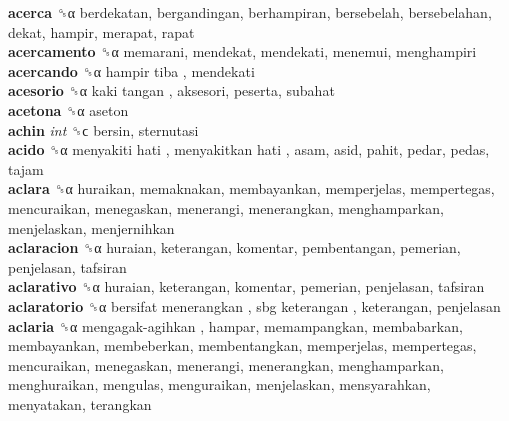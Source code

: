 \textbf{acerca} ␝α  berdekatan, bergandingan, berhampiran, bersebelah, bersebelahan, dekat, hampir, merapat, rapat  \\
\textbf{acercamento} ␝α  memarani, mendekat, mendekati, menemui, menghampiri  \\
\textbf{acercando} ␝α   hampir tiba , mendekati  \\
\textbf{acesorio} ␝α   kaki tangan , aksesori, peserta, subahat  \\
\textbf{acetona} ␝α  aseton  \\
\textbf{achin} \emph{int}  ␝ϲ  bersin, sternutasi  \\
\textbf{acido} ␝α   menyakiti hati ,  menyakitkan hati , asam, asid, pahit, pedar, pedas, tajam  \\
\textbf{aclara} ␝α  huraikan, memaknakan, membayankan, memperjelas, mempertegas, mencuraikan, menegaskan, menerangi, menerangkan, menghamparkan, menjelaskan, menjernihkan  \\
\textbf{aclaracion} ␝α  huraian, keterangan, komentar, pembentangan, pemerian, penjelasan, tafsiran  \\
\textbf{aclarativo} ␝α  huraian, keterangan, komentar, pemerian, penjelasan, tafsiran  \\
\textbf{aclaratorio} ␝α   bersifat menerangkan ,  sbg keterangan , keterangan, penjelasan  \\
\textbf{aclaria} ␝α   mengagak-agihkan , hampar, memampangkan, membabarkan, membayankan, membeberkan, membentangkan, memperjelas, mempertegas, mencuraikan, menegaskan, menerangi, menerangkan, menghamparkan, menghuraikan, mengulas, menguraikan, menjelaskan, mensyarahkan, menyatakan, terangkan  \\
